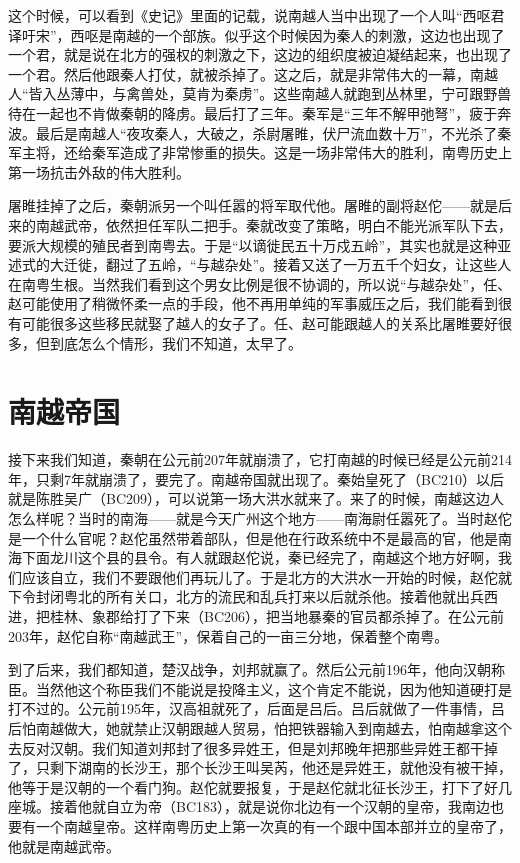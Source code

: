 这个时候，可以看到《史记》里面的记载，说南越人当中出现了一个人叫“西呕君译吁宋”，西呕是南越的一个部族。似乎这个时候因为秦人的刺激，这边也出现了一个君，就是说在北方的强权的刺激之下，这边的组织度被迫凝结起来，也出现了一个君。然后他跟秦人打仗，就被杀掉了。这之后，就是非常伟大的一幕，南越人“皆入丛薄中，与禽兽处，莫肯为秦虏”。这些南越人就跑到丛林里，宁可跟野兽待在一起也不肯做秦朝的降虏。最后打了三年。秦军是“三年不解甲弛弩”，疲于奔波。最后是南越人“夜攻秦人，大破之，杀尉屠睢，伏尸流血数十万”，不光杀了秦军主将，还给秦军造成了非常惨重的损失。这是一场非常伟大的胜利，南粤历史上第一场抗击外敌的伟大胜利。

屠睢挂掉了之后，秦朝派另一个叫任嚣的将军取代他。屠睢的副将赵佗——就是后来的南越武帝，依然担任军队二把手。秦就改变了策略，明白不能光派军队下去，要派大规模的殖民者到南粤去。于是“以谪徙民五十万戍五岭”，其实也就是这种亚述式的大迁徙，翻过了五岭，“与越杂处”。接着又送了一万五千个妇女，让这些人在南粤生根。当然我们看到这个男女比例是很不协调的，所以说“与越杂处”，任、赵可能使用了稍微怀柔一点的手段，他不再用单纯的军事威压之后，我们能看到很有可能很多这些移民就娶了越人的女子了。任、赵可能跟越人的关系比屠睢要好很多，但到底怎么个情形，我们不知道，太早了。

\section{南越帝国}


接下来我们知道，秦朝在公元前207年就崩溃了，它打南越的时候已经是公元前214年，只剩7年就崩溃了，要完了。南越帝国就出现了。秦始皇死了（BC210）以后就是陈胜吴广（BC209），可以说第一场大洪水就来了。来了的时候，南越这边人怎么样呢？当时的南海——就是今天广州这个地方——南海尉任嚣死了。当时赵佗是一个什么官呢？赵佗虽然带着部队，但是他在行政系统中不是最高的官，他是南海下面龙川这个县的县令。有人就跟赵佗说，秦已经完了，南越这个地方好啊，我们应该自立，我们不要跟他们再玩儿了。于是北方的大洪水一开始的时候，赵佗就下令封闭粤北的所有关口，北方的流民和乱兵打来以后就杀他。接着他就出兵西进，把桂林、象郡给打了下来（BC206），把当地暴秦的官员都杀掉了。在公元前203年，赵佗自称“南越武王”，保着自己的一亩三分地，保着整个南粤。

到了后来，我们都知道，楚汉战争，刘邦就赢了。然后公元前196年，他向汉朝称臣。当然他这个称臣我们不能说是投降主义，这个肯定不能说，因为他知道硬打是打不过的。公元前195年，汉高祖就死了，后面是吕后。吕后就做了一件事情，吕后怕南越做大，她就禁止汉朝跟越人贸易，怕把铁器输入到南越去，怕南越拿这个去反对汉朝。我们知道刘邦封了很多异姓王，但是刘邦晚年把那些异姓王都干掉了，只剩下湖南的长沙王，那个长沙王叫吴芮，他还是异姓王，就他没有被干掉，他等于是汉朝的一个看门狗。赵佗就要报复，于是赵佗就北征长沙王，打下了好几座城。接着他就自立为帝（BC183），就是说你北边有一个汉朝的皇帝，我南边也要有一个南越皇帝。这样南粤历史上第一次真的有一个跟中国本部并立的皇帝了，他就是南越武帝。

